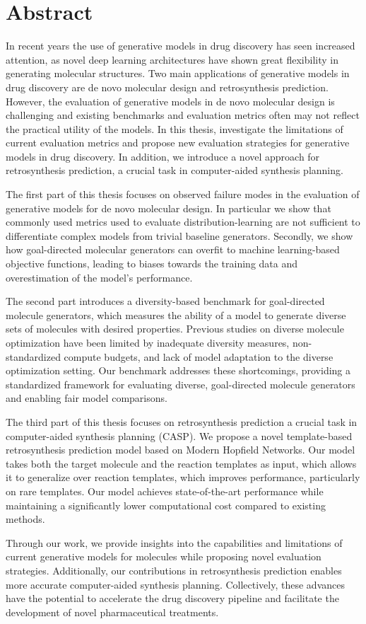 
{%
\chapter*{Abstract}
In recent years the use of generative models in drug discovery has seen increased attention, as
novel deep learning architectures have shown great flexibility in generating molecular structures.
Two main applications of generative models in drug discovery are de novo molecular design and
retrosynthesis prediction. However, the evaluation of generative models in de novo molecular design
is challenging and existing benchmarks and evaluation metrics often may not reflect the practical
utility of the models. In this thesis, investigate the limitations of current evaluation metrics and
propose new evaluation strategies for generative models in drug discovery. In addition, we introduce
a novel approach for retrosynthesis prediction, a crucial task in computer-aided synthesis planning.

The first part of this thesis focuses on observed failure modes in the evaluation of generative
models for de novo molecular design. In particular we show that commonly used metrics used to
evaluate distribution-learning are not sufficient to differentiate complex models from trivial
baseline generators. Secondly, we show how goal-directed molecular generators can overfit
to machine learning-based objective functions, leading to biases towards the training data and
overestimation of the model's performance.

The second part introduces a diversity-based benchmark for goal-directed molecule generators,
which measures the ability of a model to generate diverse sets of molecules with desired properties.
Previous studies on diverse molecule optimization have been limited by inadequate diversity
measures, non-standardized compute budgets, and lack of model adaptation to the diverse optimization
setting. Our benchmark addresses these shortcomings, providing a standardized framework for
evaluating diverse, goal-directed molecule generators and enabling fair model comparisons.

The third part of this thesis focuses on retrosynthesis prediction a crucial task in computer-aided
synthesis planning (CASP). We propose a novel template-based retrosynthesis prediction model based
on Modern Hopfield Networks. Our model takes both the target molecule and the reaction templates as
input, which allows it to generalize over reaction templates, which improves performance,
particularly on rare templates. Our model achieves state-of-the-art performance while maintaining a
significantly lower computational cost compared to existing methods.

Through our work, we provide insights into the capabilities and limitations of
current generative models for molecules while proposing novel evaluation
strategies. Additionally, our contributions in retrosynthesis prediction enables
more accurate computer-aided synthesis planning. Collectively, these advances
have the potential to accelerate the drug discovery pipeline and facilitate the
development of novel pharmaceutical treatments.
}